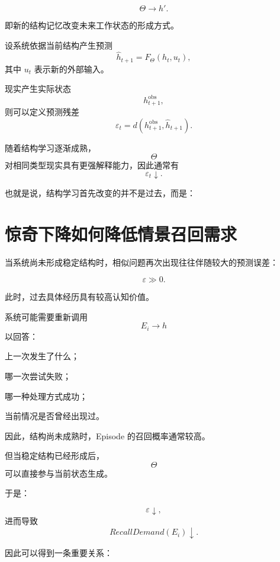 \[
\boxed{
\Theta
\rightarrow
h'.
}
\]

即新的结构记忆改变未来工作状态的形成方式。

设系统依据当前结构产生预测
\[
\hat h_{t+1}
=
F_\Theta(h_t,u_t),
\]
其中 $u_t$ 表示新的外部输入。

现实产生实际状态
\[
h_{t+1}^{\mathrm{obs}},
\]
则可以定义预测残差
\[
\varepsilon_t
=
d
\left(
h_{t+1}^{\mathrm{obs}},
\hat h_{t+1}
\right).
\]

随着结构学习逐渐成熟，
\[
\Theta
\]
对相同类型现实具有更强解释能力，因此通常有
\[
\boxed{
\varepsilon_t\downarrow.
}
\]

也就是说，结构学习首先改变的并不是过去，而是：

\begin{statementbox}
\centering
{}
\end{statementbox}

\section{惊奇下降如何降低情景召回需求}

当系统尚未形成稳定结构时，相似问题再次出现往往伴随较大的预测误差：

\[
\varepsilon\gg 0.
\]

此时，过去具体经历具有较高认知价值。

系统可能需要重新调用
\[
E_i\rightarrow h
\]
以回答：

上一次发生了什么；

哪一次尝试失败；

哪一种处理方式成功；

当前情况是否曾经出现过。

因此，结构尚未成熟时，Episode 的召回概率通常较高。

但当稳定结构已经形成后，
\[
\Theta
\]
可以直接参与当前状态生成。

于是：

\[
\varepsilon\downarrow,
\]
进而导致
\[
RecallDemand(E_i)\downarrow.
\]

因此可以得到一条重要关系：

\begin{statementbox}
\centering
{}
\end{statementbox}

